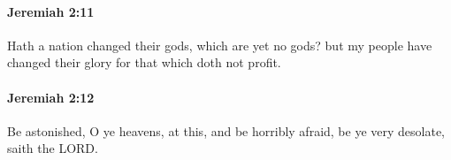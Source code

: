 		\paragraph{Jeremiah 2:11} %
			\label{JEREMIAH-2-11}

			Hath a nation changed their gods, which are yet no gods? but my people have changed their glory for that which doth not profit.


		\paragraph{Jeremiah 2:12} %
			\label{JEREMIAH-2-12}

			Be astonished, O ye heavens, at this, and be horribly afraid, be ye very desolate, saith the LORD.


